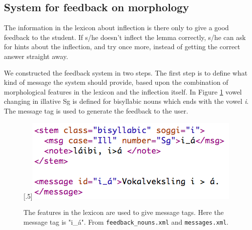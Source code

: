 \documentclass[11pt]{article}
\begin{document}
\subsection{System for feedback on morphology}

The information in the lexicon about inflection is there only to give a good feedback to the student. If s/he doesn't inflect the lemma correctly, s/he can ask for hints about the inflection, and try once more, instead of getting the correct answer straight away. 

We constructed the feedback system in two steps. The first step is to define what kind of message the system should provide, based upon the combination of morphological features in the lexicon and the inflection itself. In Figure \ref{feedbacknouns} vowel changing in illative Sg is defined for bisyllabic nouns which ends with the vowel \textit{i}. The message tag is used to generate the feedback to the user. 

\begin{figure}[htbp]
\begin{center}
\scalebox{.5}[.5]{\includegraphics{presentation/img/morphfeedback.png}}\\
\caption{The features in the lexicon are used to give message tags. Here the message tag is "i\_á". From \texttt{feedback\_nouns.xml} and \texttt{messages.xml}.}
\label{feedbacknouns}
\end{center}
\end{figure}


%
\end{document}
